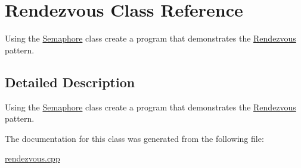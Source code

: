 \hypertarget{class_rendezvous}{}\section{Rendezvous Class Reference}
\label{class_rendezvous}


Using the \mbox{\hyperlink{class_semaphore}{Semaphore}} class create a program that demonstrates the \mbox{\hyperlink{class_rendezvous}{Rendezvous}} pattern.  




\subsection{Detailed Description}
Using the \mbox{\hyperlink{class_semaphore}{Semaphore}} class create a program that demonstrates the \mbox{\hyperlink{class_rendezvous}{Rendezvous}} pattern. 

The documentation for this class was generated from the following file\+:\begin{DoxyCompactItemize}
\item 
\mbox{\hyperlink{rendezvous_8cpp}{rendezvous.\+cpp}}\end{DoxyCompactItemize}
